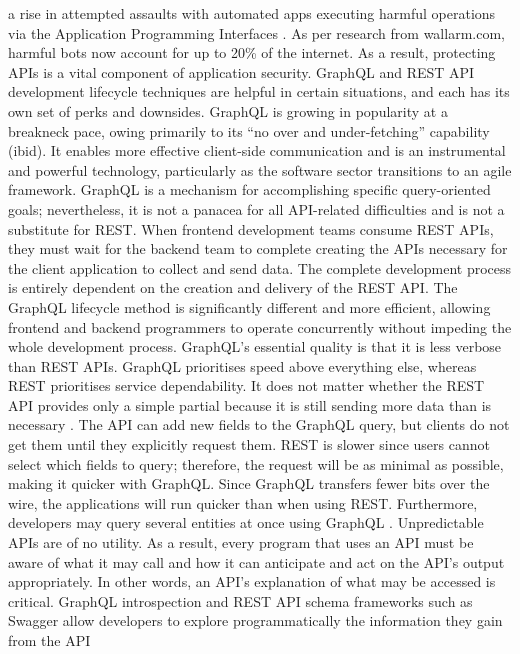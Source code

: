 a rise in attempted assaults with automated apps executing harmful operations
via the Application Programming Interfaces \citep{
hartigInitialAnalysisFacebook2017}. As per research from wallarm.com, harmful
bots now account for up to 20\% of the internet. As a result, protecting
APIs is a vital component of application security. GraphQL and REST API
development lifecycle techniques are helpful in certain situations, and each has
its own set of perks and downsides. GraphQL is growing in popularity at a
breakneck pace, owing primarily to its ``no over and under-fetching'' capability
(ibid). It enables more effective client-side communication and is an
instrumental and powerful technology, particularly as the software sector
transitions to an agile framework. GraphQL is a mechanism for accomplishing
specific query-oriented goals; nevertheless, it is not a panacea for all
API-related difficulties and is not a substitute for REST. When frontend
development teams consume REST APIs, they must wait for the backend team to
complete creating the APIs necessary for the client application to collect and
send data. The complete development process is entirely dependent on the
creation and delivery of the REST API. The GraphQL lifecycle method is
significantly different and more efficient, allowing frontend and backend
programmers to operate concurrently without impeding the whole development
process. GraphQL's essential quality is that it is less verbose than REST APIs.
GraphQL prioritises speed above everything else, whereas REST prioritises
service dependability. It does not matter whether the REST API provides only a
simple partial because it is still sending more data than is necessary
\citep{vadlamaniCanGraphQLReplace2021}. The API can add new fields to the
GraphQL query, but clients do not get them until they explicitly request them.
REST is slower since users cannot select which fields to query; therefore, the
request will be as minimal as possible, making it quicker with GraphQL. Since
GraphQL transfers fewer bits over the wire, the applications will run quicker
than when using REST. Furthermore, developers may query several entities at
once using GraphQL \citep{lawiEvaluatingGraphQLREST2021}. Unpredictable APIs are
of no utility. As a result, every program that uses an API must be aware of what
it may call and how it can anticipate and act on the API's output appropriately.
In other words, an API's explanation of what may be accessed is critical.
GraphQL introspection and REST API schema frameworks such as Swagger allow
developers to explore programmatically the information they gain from the API
